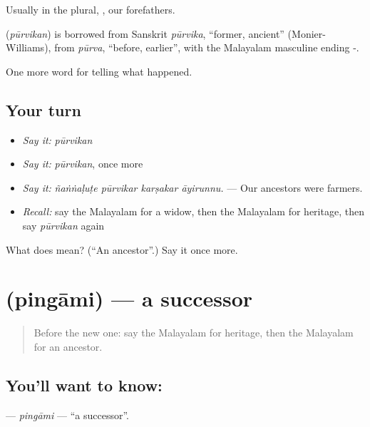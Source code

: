 Usually in the plural, , our forefathers.

\begin{cousinweb}
\textbf{} (\emph{pūrvikan}) is borrowed from Sanskrit \emph{pūrvika}, \textquotedblleft{}former, ancient\textquotedblright{} (Monier-Williams), from \emph{pūrva}, \textquotedblleft{}before, earlier\textquotedblright{}, with the Malayalam masculine ending -.
\end{cousinweb}

\begin{grammarlens}[title={What you've built}]
One more word for telling what happened.
\end{grammarlens}

\subsection*{Your turn}
\begin{itemize}
\raggedright
  \item \emph{Say it:} \emph{pūrvikan}
  \item \emph{Say it:} \emph{pūrvikan}, once more
  \item \emph{Say it:} \emph{ñaṅṅaḷuṭe pūrvikar karṣakar āyirunnu.} — Our ancestors were farmers.
  \item \emph{Recall:} say the Malayalam for a widow, then the Malayalam for heritage, then say \emph{pūrvikan} again
\end{itemize}

\begin{tcolorbox}[breakable,colback=teal!4,colframe=teal!35!black,title={Before you move on}]
What does  mean? (\textquotedblleft{}An ancestor\textquotedblright{}.) Say it once more.
\end{tcolorbox}
\section[\texorpdfstring{\ml{പിൻഗാമി} (pingāmi)}{പിൻഗാമി (pingāmi)}]{ (pingāmi) — a successor}

\label{lesson:ML-C395-pingami}



\begin{quote}
Before the new one: say the Malayalam for heritage, then the Malayalam for an ancestor.
\end{quote}

\subsection*{You'll want to know: }
\textbf{} — \emph{pingāmi} — \textquotedblleft{}a successor\textquotedblright{}.

